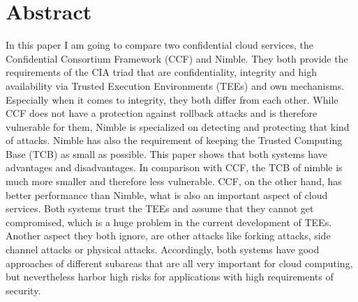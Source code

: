 \section*{Abstract}	
 In this paper I am going to compare two confidential cloud services, the Confidential Consortium Framework (CCF) and Nimble. They both provide the requirements of the CIA triad that are confidentiality, integrity and high availability via Trusted Execution Environments (TEEs) and own mechanisms. Especially when it comes to integrity, they both differ from each other. While CCF does not have a protection against rollback attacks and is therefore vulnerable for them, Nimble is specialized on detecting and protecting that kind of attacks. Nimble has also the requirement of keeping the Trusted Computing Base (TCB) as small as possible. This paper shows that both systems have advantages and disadvantages. In comparison with CCF, the TCB of nimble is much more smaller and therefore less vulnerable. CCF, on the other hand, has better performance than Nimble, what is also an important aspect of cloud services. Both systems trust the TEEs and assume that they cannot get compromised, which is a huge problem in the current development of TEEs. Another aspect they both ignore, are other attacks like forking attacks, side channel attacks or physical attacks. Accordingly, both systems have good approaches of different subareas that are all very important for cloud computing, but nevertheless harbor high risks for applications with high requirements of security.\\